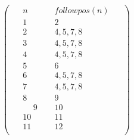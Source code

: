 \documentclass[a4paper,12pt]{article} %
\begin{document}
\[
\begin{pmatrix}

  \hspace{15pt} n & \hspace{15pt} followpos(n) \hspace{15pt}\\
 \hspace{15pt}1 &  \hspace{15pt}2 \hspace{15pt}\\
 \hspace{15pt}2 &  \hspace{15pt}4,5,7,8 \hspace{15pt}\\
 \hspace{15pt}3 &  \hspace{15pt}4,5,7,8 \hspace{15pt}\\
 \hspace{15pt}4 &  \hspace{15pt}4,5,7,8 \hspace{15pt}\\
 \hspace{15pt}5 &  \hspace{15pt}6  \hspace{15pt}\\
 \hspace{15pt}6 &  \hspace{15pt}4,5,7,8  \hspace{15pt}\\
 \hspace{15pt}7 &  \hspace{15pt}4,5,7,8  \hspace{15pt}\\
 \hspace{15pt}8 &  \hspace{15pt}9  \hspace{15pt}\\
 \hspace{15pt} \hspace{15pt}9 &  \hspace{15pt}10\\
 \hspace{15pt}10 &  \hspace{15pt}11 \hspace{15pt}\\
 \hspace{15pt}11 &  \hspace{15pt}12  \hspace{15pt}\\
\end{pmatrix}
\]
\end{document}
